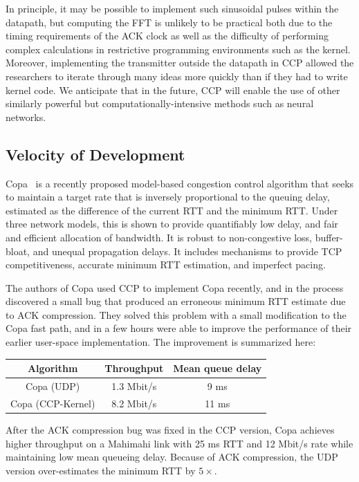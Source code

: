 In principle, it may be possible to implement such sinusoidal pulses within the datapath, but computing the FFT is unlikely to be practical both due to the timing requirements of the ACK clock as well as the difficulty of performing complex calculations in restrictive programming environments such as the kernel. Moreover, implementing the transmitter outside the datapath in CCP allowed the researchers to iterate through many ideas more quickly than if they had to write kernel code.
We anticipate that in the future, CCP will enable the use of other similarly powerful but computationally-intensive methods such as neural networks.

\subsection{Velocity of Development}
\label{s:capabilities:velocity}

Copa~\cite{copa} is a recently proposed model-based congestion control algorithm that seeks to maintain a target rate that is inversely proportional to the queuing delay, estimated as the difference of the current RTT and the minimum RTT.
Under three network models, this is shown to provide quantifiably low delay, and fair and efficient allocation of bandwidth.
It is robust to non-congestive loss, buffer-bloat, and unequal propagation delays. It includes mechanisms to provide TCP competitiveness, accurate minimum RTT estimation, and imperfect pacing.

The authors of Copa used CCP to implement Copa recently, and in the process discovered a small bug that produced an erroneous minimum RTT estimate due to ACK compression. They solved this problem with a small modification to the Copa fast path,
and in a few hours were able to improve the performance of their earlier user-space implementation. The improvement is summarized here:\\

    \begin{tabular}{c|c|c}
        Algorithm & Throughput & Mean queue delay \\
        \hline
        Copa (UDP) & 1.3 Mbit/s & 9 ms\\
        Copa (CCP-Kernel) & 8.2 Mbit/s  & 11 ms\\
    \end{tabular}

\smallskip
After the ACK compression bug was fixed in the CCP version, Copa achieves higher throughput on a Mahimahi link with 25 ms RTT and 12 Mbit/s rate while maintaining low mean queueing delay. Because of ACK compression, the UDP version over-estimates the minimum RTT by $5\times$.

